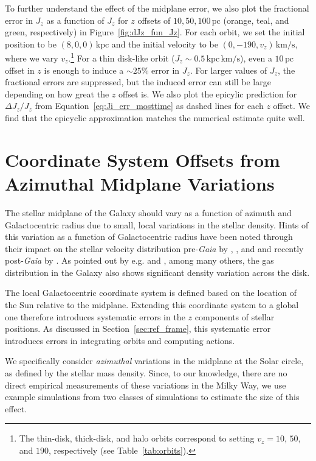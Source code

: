 \documentclass[twocolumn]{aastex62}
\newcommand{\pc}{\text{pc}}
\newcommand{\kpc}{\text{kpc}}
\newcommand{\kms}{\text{km}/\text{s}}
\newcommand{\actunit}{\text{kpc}\,\kms}
\begin{document}
To further understand the effect of the midplane error, we also plot the
fractional error in $J_z$ as a function of $J_z$ for $z$ offsets of $10, 50,
100\,\pc$ (orange, teal, and green, respectively) in
Figure~\ref{fig:dJz_fun_Jz}. For each orbit, we set the initial position to be
$(8,0,0)\,\kpc$ and the initial velocity to be $(0, -190, v_z)\,\kms$, where
we vary $v_z$.\footnote{The thin-disk, thick-disk, and halo orbits correspond to setting $v_z=10$, $50$, and $190$, respectively (see Table~\ref{tab:orbits}).} For a thin disk-like orbit ($J_z\sim0.5\,\actunit$), even a
$10\,\pc$ offset in $z$ is enough to induce a $\sim25\%$ error in $J_z$. For
larger values of $J_z$, the fractional errors are suppressed, but the induced
error can still be large depending on how great the $z$ offset is. We also
plot the epicylic prediction for $\Delta J_z / J_z$ from
Equation~\eqref{eq:Ji_err_mosttime} as dashed lines for each $z$ offset. We
find that the epicyclic approximation matches the numerical estimate quite
well.

\section{Coordinate System Offsets from Azimuthal Midplane Variations}
\label{sec:local_fire}

The stellar midplane of the Galaxy should vary as a function of azimuth and
Galactocentric radius due to small, local variations in the stellar density.
Hints of this variation as a function of Galactocentric radius have been noted
through their impact on the stellar velocity distribution pre-\emph{Gaia} by
\citet{2012ApJ...750L..41W}, \citet{2013ApJ...777L...5C}, and
\citet{2013MNRAS.436..101W} and recently post-\emph{Gaia} by
\citet{2019arXiv190209569F}. As pointed out by e.g.
\citet{2014ApJ...797...53G} and \citet{2019ApJ...871..145A}, among many
others, the gas distribution in the Galaxy also shows significant density
variation across the disk.

The local Galactocentric coordinate system is defined based on the location of
the Sun relative to the midplane. Extending this coordinate system to a global
one therefore introduces systematic errors in the $z$ components of stellar
positions. As discussed in Section~\ref{sec:ref_frame}, this systematic error
introduces errors in integrating orbits and computing actions.

We specifically consider \emph{azimuthal} variations in the midplane at the Solar circle, as defined by the stellar mass density. Since, to our knowledge, there are no direct empirical measurements of these variations in the Milky Way, we use example simulations from two classes of simulations to estimate the size of this effect. 
\end{document}
